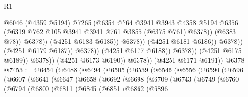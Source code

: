 \begin{lexlean}{R1}
\begin{coremodule}
                                                @6046
                                                (@4359 @5194)
                                                @7265
                                                (@6354
                                                  @764
                                                  @3941
                                                  @3943
                                                  @4358
                                                  @5194
                                                  @6366
                                                  (@6319
                                                    @762
                                                    @105
                                                    @3941
                                                    @3941
                                                    @761
                                                    @3856
                                                    (@6375 @761)
                                                    @6378))
                                                (@6383 @78))
                                              @6378))
                                          (@4251 @6183 @6185))
                                        @6378))
                                    (@4251 @6181 @6186))
                                  @6378))
                              (@4251 @6179 @6187))
                            @6378))
                        (@4251 @6177 @6188))
                      @6378))
                  (@4251 @6175 @6189))
                @6378))
            (@4251 @6173 @6190))
          @6378))
      (@4251 @6171 @6191))
    @6378
@7453 := @6454
    (@6488
      (@6494
        (@6505
          (@6539
            (@6545
              (@6556
                (@6590
                  (@6596
                    (@6607
                      (@6641
                        (@6647
                          (@6658
                            (@6692
                              (@6698
                                (@6709
                                  (@6743
                                    (@6749
                                      (@6760
                                        (@6794
                                          (@6800
                                            (@6811
                                              (@6845
                                                (@6851
                                                  (@6862
                                                    (@6896

\end{coremodule}
\end{lexlean}
